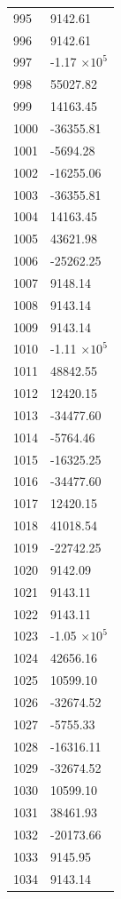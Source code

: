 \documentclass[a4paper,11pt]{article}
\begin{document}
\begin{center}
\begin{longtable}{|R{1.5cm}|R{2.5cm}|}
  995 &      9142.61 \\
  996 &      9142.61 \\
  997 &        -1.17 $\times 10^{           5}$ \\
  998 &     55027.82 \\
  999 &     14163.45 \\
 1000 &    -36355.81 \\
 1001 &     -5694.28 \\
 1002 &    -16255.06 \\
 1003 &    -36355.81 \\
 1004 &     14163.45 \\
 1005 &     43621.98 \\
 1006 &    -25262.25 \\
 1007 &      9148.14 \\
 1008 &      9143.14 \\
 1009 &      9143.14 \\
 1010 &        -1.11 $\times 10^{           5}$ \\
 1011 &     48842.55 \\
 1012 &     12420.15 \\
 1013 &    -34477.60 \\
 1014 &     -5764.46 \\
 1015 &    -16325.25 \\
 1016 &    -34477.60 \\
 1017 &     12420.15 \\
 1018 &     41018.54 \\
 1019 &    -22742.25 \\
 1020 &      9142.09 \\
 1021 &      9143.11 \\
 1022 &      9143.11 \\
 1023 &        -1.05 $\times 10^{           5}$ \\
 1024 &     42656.16 \\
 1025 &     10599.10 \\
 1026 &    -32674.52 \\
 1027 &     -5755.33 \\
 1028 &    -16316.11 \\
 1029 &    -32674.52 \\
 1030 &     10599.10 \\
 1031 &     38461.93 \\
 1032 &    -20173.66 \\
 1033 &      9145.95 \\
 1034 &      9143.14 \\

\end{longtable}
\end{center}
\end{document}
